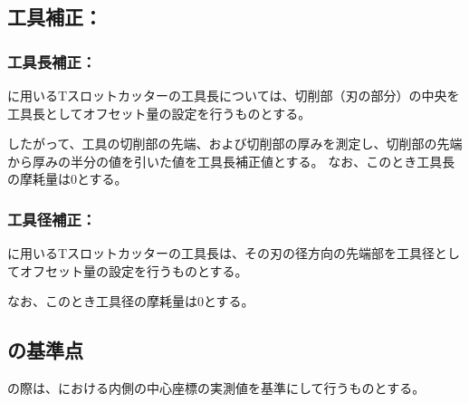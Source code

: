 \subsection{工具補正：\DimpleMilling}

\subsubsection{工具長補正：\DimpleMilling}
\DimpleMilling に用いるTスロットカッターの工具長については、切削部（刃の部分）の中央を工具長としてオフセット量の設定を行うものとする。

したがって、工具の切削部の先端、および切削部の厚みを測定し、切削部の先端から厚みの半分の値を引いた値を工具長補正値とする。
なお、このとき工具長の摩耗量は0とする。

\subsubsection{工具径補正：\DimpleMilling}
\DimpleMilling に用いるTスロットカッターの工具長は、その刃の径方向の先端部を工具径としてオフセット量の設定を行うものとする。

なお、このとき工具径の摩耗量は0とする。


\subsection{\DimpleMilling の基準点}
\DimpleMilling の際は、\TopEndFace における内側の中心座標の実測値を基準にして行うものとする。


